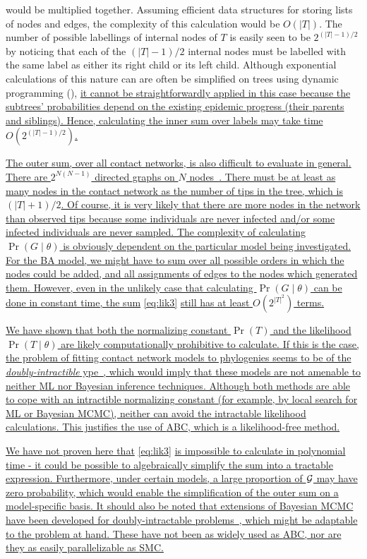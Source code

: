 {{would be multiplied together. Assuming efficient data structures for storing
lists of nodes and edges, the complexity of this calculation would be $O(|T|)$.
The number of possible labellings of internal nodes of $T$ is easily seen to be
$2^{(|T|-1)/2}$ by noticing that each of the $(|T|-1)/2$ internal nodes must be
labelled with the same label as either its right child or its left child.
Although exponential calculations of this nature can are often be simplified on 
trees using dynamic programming} (\eg \autocite{pupko2000fast}), \uline{it
cannot be straightforwardly applied in this case because the subtrees'
probabilities depend on the existing epidemic progress (their parents and
siblings). Hence, calculating the inner sum over labels may take time
$O(2^{(|T|-1)/2})$.}

\uline{The outer sum, over all contact networks, is also difficult to evaluate
in general. There are $2^{N(N-1)}$ directed graphs on $N$
nodes~\autocite{harary2014graphical}. There must be at least as many nodes in
the contact network as the number of tips in the tree, which is $(|T|+1)/2$. Of
course, it is very likely that there are more nodes in the network than
observed tips because some individuals are never infected and/or some infected
individuals are never sampled. The complexity of calculating $\Pr(G \mid
\theta)$ is obviously dependent on the particular model being investigated. For
the \gls{BA} model, we might have to sum over all possible orders in which the
nodes could be added, and all assignments of edges to the nodes which generated
them. However, even in the unlikely case that calculating $\Pr(G \mid \theta)$
can be done in constant time, the sum} \ref{eq:lik3} \uline{still has at least
$O(2^{|T|^2})$ terms.}

\uline{We have shown that both the normalizing constant $\Pr(T)$ and the
likelihood $\Pr(T \mid \theta)$ are likely computationally prohibitive to
calculate. If this is the case, the problem of fitting contact network models
to phylogenies seems to be of the \emph{doubly-intractible}
ype~\autocite{murray2012mcmc}, which would imply that these models are not
amenable to neither \gls{ML} nor Bayesian inference techniques. Although both
methods are able to cope with an intractible normalizing constant (for example,
by local search for \gls{ML} or Bayesian \gls{MCMC}), neither can avoid the
intractable likelihood calculations. This justifies the use of \gls{ABC}, which
is a likelihood-free method.}

\uline{We have not proven here that} \cref{eq:lik3} \uline{is impossible to
calculate in polynomial time - it could be possible to algebraically simplify
the sum into a tractable expression. Furthermore, under certain models, a large
proportion of $\mathcal{G}$ may have zero probability, which would enable the
simplification of the outer sum on a model-specific basis. It should also be
noted that extensions of Bayesian \gls{MCMC} have been developed for
doubly-intractable problems~\autocite{liang2010double, murray2012mcmc}, which
might be adaptable to the problem at hand. These have not been as widely used
as \gls{ABC}, nor are they as easily parallelizable as \gls{SMC}. }}

